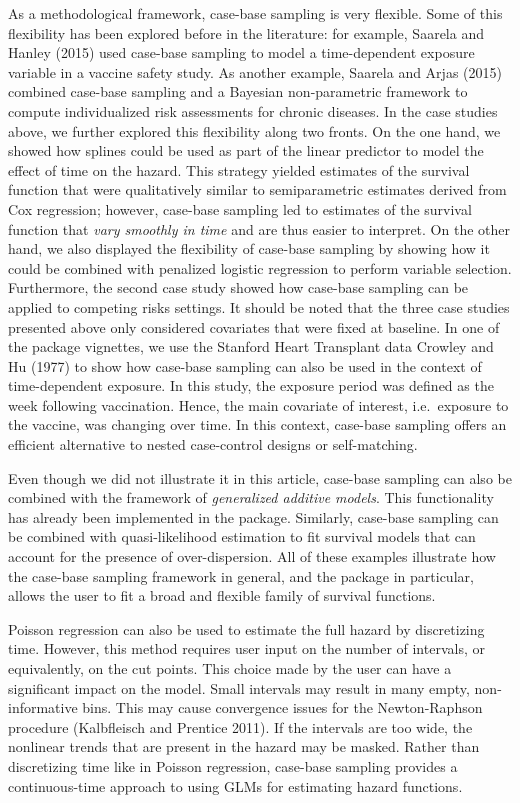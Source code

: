As a methodological framework, case-base sampling is very flexible. Some of this flexibility has been explored before in the literature: for example, Saarela and Hanley (2015) used case-base sampling to model a time-dependent exposure variable in a vaccine safety study. As another example, Saarela and Arjas (2015) combined case-base sampling and a Bayesian non-parametric framework to compute individualized risk assessments for chronic diseases. In the case studies above, we further explored this flexibility along two fronts. On the one hand, we showed how splines could be used as part of the linear predictor to model the effect of time on the hazard. This strategy yielded estimates of the survival function that were qualitatively similar to semiparametric estimates derived from Cox regression; however, case-base sampling led to estimates of the survival function that \emph{vary smoothly in time} and are thus easier to interpret. On the other hand, we also displayed the flexibility of case-base sampling by showing how it could be combined with penalized logistic regression to perform variable selection. Furthermore, the second case study showed how case-base sampling can be applied to competing risks settings. It should be noted that the three case studies presented above only considered covariates that were fixed at baseline. In one of the package vignettes, we use the Stanford Heart Transplant data Crowley and Hu (1977) to show how case-base sampling can also be used in the context of time-dependent exposure. In this study, the exposure period was defined as the week following vaccination. Hence, the main covariate of interest, i.e.~exposure to the vaccine, was changing over time. In this context, case-base sampling offers an efficient alternative to nested case-control designs or self-matching.

Even though we did not illustrate it in this article, case-base sampling can also be combined with the framework of \emph{generalized additive models}. This functionality has already been implemented in the package. Similarly, case-base sampling can be combined with quasi-likelihood estimation to fit survival models that can account for the presence of over-dispersion. All of these examples illustrate how the case-base sampling framework in general, and the package  in particular, allows the user to fit a broad and flexible family of survival functions.

Poisson regression can also be used to estimate the full hazard by discretizing time. However, this method requires user input on the number of intervals, or equivalently, on the cut points. This choice made by the user can have a significant impact on the model. Small intervals may result in many empty, non-informative bins. This may cause convergence issues for the Newton-Raphson procedure (Kalbfleisch and Prentice 2011). If the intervals are too wide, the nonlinear trends that are present in the hazard may be masked. Rather than discretizing time like in Poisson regression, case-base sampling provides a continuous-time approach to using GLMs for estimating hazard functions.

